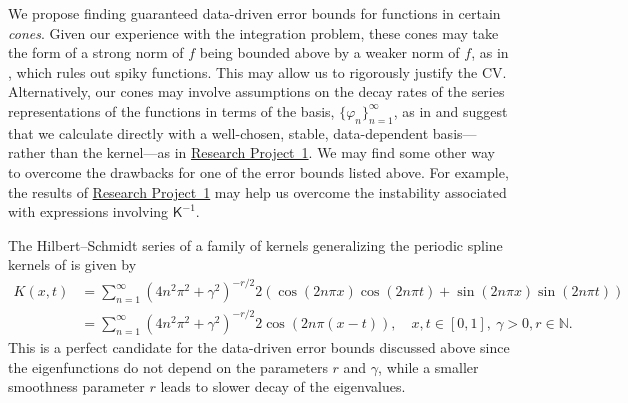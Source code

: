 \documentclass[11pt]{NSFamsart}
\newcommand{\mK}{\mathsf{K}}
\newcommand{\refproba}{\hyperref[SectHSSVD]{Research Project~1}\xspace}
\begin{document}
We propose finding guaranteed data-driven error bounds for functions in certain  \emph{cones}.  Given our experience with the integration problem, these cones may take the form of a strong norm of $f$ being bounded above by a weaker norm of $f$, as in \cite{HicEtal14b}, which rules out spiky functions.  This may allow us to rigorously justify the CV. Alternatively, our cones may involve assumptions on the decay rates of the series representations of the functions in terms of the basis, $\{\varphi_n\}_{n=1}^{\infty}$, as in \cite{HicJim16a,JimHic16a} and suggest that we calculate directly with a well-chosen, stable, data-dependent basis---rather than the kernel---as in \refproba.  We may find some other way to overcome the drawbacks for one of the error bounds listed above.  For example, the results of \refproba may help us overcome the instability associated with expressions involving $\mK^{-1}$.


The Hilbert--Schmidt series of a family of kernels generalizing the periodic spline kernels of \citep[Chapt.~2]{Wah90} is given by
\begin{align}\label{PeriodicKernel}
K(x,t) &= \sum_{n=1}^\infty \left(4n^2\pi^2 + \gamma^2\right)^{-r/2} 2\left(\cos (2n\pi x) \cos (2n\pi t) + \sin (2n\pi x) \sin (2n\pi t)\right) \\
 &= \sum_{n=1}^\infty \left(4n^2\pi^2 + \gamma^2\right)^{-r/2} 2\cos\left(2n\pi(x-t)\right), \quad x,t \in [0,1],\ \gamma>0, r \in \mathbb{N}. \nonumber
\end{align}
This is a perfect candidate for the data-driven error bounds discussed above since the eigenfunctions do not depend on the parameters $r$ and $\gamma$, while a smaller smoothness parameter $r$ leads to slower decay of the eigenvalues.
\end{document}
